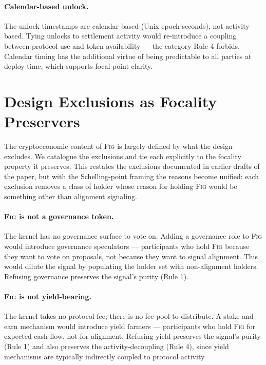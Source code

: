 \documentclass[11pt,a4paper]{article}
\theoremstyle{definition}
\theoremstyle{remark}
\newcommand{\fig}{\textsc{Fig}}
\begin{document}
\paragraph{Calendar-based unlock.}
The unlock timestamps are calendar-based (Unix epoch seconds),
not activity-based. Tying unlocks to settlement activity would
re-introduce a coupling between protocol use and token
availability --- the category Rule 4 forbids. Calendar timing
has the additional virtue of being predictable to all parties at
deploy time, which supports focal-point clarity.

\section{Design Exclusions as Focality Preservers}
\label{sec:negatives}

The cryptoeconomic content of \fig{} is largely defined by what
the design excludes. We catalogue the exclusions and tie each
explicitly to the focality property it preserves. This restates
the exclusions documented in earlier drafts of the paper, but
with the Schelling-point framing the reasons become unified: each
exclusion removes a class of holder whose reason for holding
\fig{} would be something other than alignment signaling.

\paragraph{\fig{} is not a governance token.}
The kernel has no governance surface to vote on. Adding a
governance role to \fig{} would introduce governance
speculators --- participants who hold \fig{} because they want
to vote on proposals, not because they want to signal
alignment. This would dilute the signal by populating the
holder set with non-alignment holders. Refusing governance
preserves the signal's purity (Rule 1).

\paragraph{\fig{} is not yield-bearing.}
The kernel takes no protocol fee; there is no fee pool to
distribute. A stake-and-earn mechanism would introduce yield
farmers --- participants who hold \fig{} for expected cash flow,
not for alignment. Refusing yield preserves the signal's
purity (Rule 1) and also preserves the activity-decoupling
(Rule 4), since yield mechanisms are typically indirectly coupled
to protocol activity.
\end{document}

